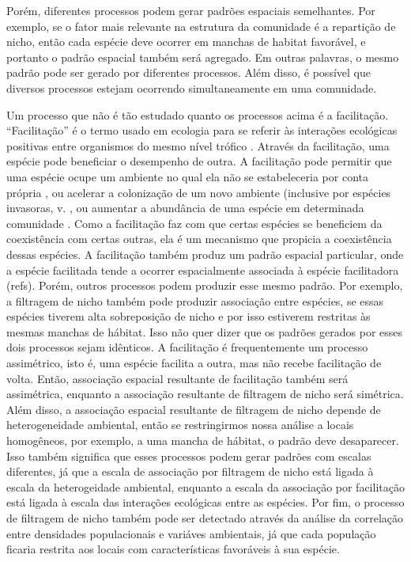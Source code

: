 \documentclass[twoside,12pt,a4paper]{report}
\begin{document}
Porém, diferentes processos podem gerar padrões espaciais semelhantes. Por exemplo, se o
fator mais relevante na estrutura da comunidade é a repartição de nicho, então cada espécie
deve ocorrer em manchas de habitat favorável, e portanto o padrão espacial também será
agregado. Em outras palavras, o mesmo padrão pode ser gerado por diferentes processos. Além
disso, é possível que diversos processos estejam ocorrendo simultaneamente em uma comunidade.

Um processo que não é tão estudado quanto os processos acima é a facilitação.
“Facilitação” é o termo usado em ecologia para se referir às interações ecológicas positivas entre
organismos do mesmo nível trófico \citep{Pakeman2009}. 
Através da facilitação, uma espécie pode beneficiar o desempenho de outra. 
A facilitação pode permitir que uma
espécie ocupe um ambiente no qual ela não se estabeleceria por conta própria \citep{Lortie2004},
ou acelerar a colonização de um novo ambiente (inclusive por espécies invasoras, v.
\citep{Wundrow2012}, ou aumentar a abundância de uma espécie em determinada comunidade \citep{Alados2006; CallawayBook}.
Como a facilitação faz com que certas espécies se beneficiem da coexistência com certas
outras, ela é um mecanismo que propicia a coexistência dessas espécies.
A facilitação também produz um padrão espacial particular, onde a espécie facilitada tende a
ocorrer espacialmente associada à espécie facilitadora (refs).
Porém, outros processos podem produzir esse mesmo padrão. Por exemplo, a filtragem de nicho
também pode produzir associação entre espécies, se essas espécies tiverem alta sobreposição
de nicho e por isso estiverem restritas às mesmas manchas de hábitat. Isso não quer dizer que
os padrões gerados por esses dois processos sejam idênticos. A facilitação é frequentemente
um processo assimétrico, isto é, uma espécie facilita a outra, mas não recebe facilitação de
volta. Então, associação espacial resultante de facilitação também será assimétrica, enquanto
a associação resultante de filtragem de nicho será simétrica. Além disso, a associação
espacial resultante de filtragem de nicho depende de heterogeneidade ambiental, então se
restringirmos nossa análise a locais homogêneos, por exemplo, a uma mancha de hábitat, o
padrão deve desaparecer. Isso também significa que esses processos podem gerar padrões com
escalas diferentes, já que a escala de associação por filtragem de nicho está ligada à escala
da heterogeidade ambiental, enquanto a escala da associação por facilitação está ligada à
escala das interações ecológicas entre as espécies. Por fim, o processo de filtragem de nicho
também pode ser detectado através da análise da correlação entre densidades populacionais e
variáves ambientais, já que cada população ficaria restrita aos locais com características
favoráveis à sua espécie.
\end{document}
